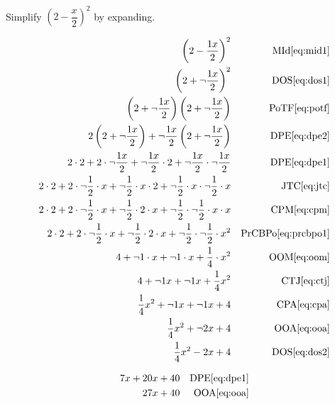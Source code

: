 \documentclass[20150903-160354-rs2.2-MarksMathNotebook.tex]{subfiles}
\begin{document}
\begin{example}[id:20141105-161225]\label{20141105-161225}  \hfill \\

Simplify $\left(2-\dfrac{x}{2} \right)^2$ by expanding.

\soln

\solnsteps
\begin{align*}
\left(2-\dfrac{1x}{2} \right)^2 && \text{MId} \eqref{eq:mid1} \\
\left(2+ \neg \dfrac{1x}{2} \right)^2 && \text{DOS} \eqref{eq:dos1} \\
\left(2+ \neg \dfrac{1x}{2} \right)\left(2+ \neg \dfrac{1x}{2} \right) && \text{PoTF} \eqref{eq:potf} \\
2\left(2+ \neg \dfrac{1x}{2} \right) + \neg \dfrac{1x}{2}\left(2+ \neg \dfrac{1x}{2} \right) && \text{DPE} \eqref{eq:dpe2} \\
2 \cdot 2 + 2 \cdot \neg \dfrac{1x}{2} + \neg \dfrac{1x}{2} \cdot 2 + \neg \dfrac{1x}{2} \cdot \neg \dfrac{1x}{2} && \text{DPE} \eqref{eq:dpe1} \\
2 \cdot 2 + 2 \cdot \neg \dfrac{1}{2} \cdot x + \neg \dfrac{1}{2} \cdot x \cdot 2 + \neg \dfrac{1}{2} \cdot x \cdot \neg \dfrac{1}{2} \cdot x && \text{JTC} \eqref{eq:jtc} \\
2 \cdot 2 + 2 \cdot \neg \dfrac{1}{2} \cdot x + \neg \dfrac{1}{2} \cdot 2 \cdot x + \neg \dfrac{1}{2} \cdot \neg \dfrac{1}{2} \cdot x \cdot x && \text{CPM} \eqref{eq:cpm} \\
2 \cdot 2 + 2 \cdot \neg \dfrac{1}{2} \cdot x + \neg \dfrac{1}{2} \cdot 2 \cdot x + \neg \dfrac{1}{2} \cdot \neg \dfrac{1}{2} \cdot x^2 && \text{PrCBPo} \eqref{eq:prcbpo1} \\
4 + \neg 1 \cdot x + \neg 1 \cdot x +  \dfrac{1}{4} \cdot x^2 && \text{OOM} \eqref{eq:oom} \\
4 + \neg 1 x + \neg 1 x +  \dfrac{1}{4} x^2 && \text{CTJ} \eqref{eq:ctj} \\
\dfrac{1}{4} x^2 + \neg 1 x + \neg 1 x + 4 && \text{CPA} \eqref{eq:cpa} \\
\dfrac{1}{4} x^2 + \neg 2 x + 4 && \text{OOA} \eqref{eq:ooa} \\
\dfrac{1}{4} x^2 - 2 x + 4 && \text{DOS} \eqref{eq:dos2}
\end{align*}

\soln

\lesssteps
\begin{align*}
7x + 20x + 40 && \text{DPE} \eqref{eq:dpe1} \\
27x + 40 && \text{OOA} \eqref{eq:ooa}
\end{align*}
\end{example}
\end{document}
